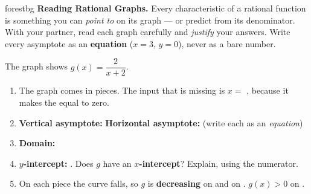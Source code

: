\documentclass[10pt]{article}
\newcommand{\lgrid}[4]{%
  \draw[step=1, linegray!40, very thin] (#1,#3) grid (#2,#4);
  \draw[->, semithick, charcoal] (#1,0)--(#2,0) node[below right, font=\scriptsize]{$x$};
  \draw[->, semithick, charcoal] (0,#3)--(0,#4) node[left, font=\scriptsize]{$y$};}
\begin{document}
\namepartnerperiod

\vspace{0.08in}

\begin{headlinebox}{forestbg}
\small\textbf{Reading Rational Graphs.} Every characteristic of a rational function is something you
can \emph{point to} on its graph --- or predict from its denominator. With your partner, read each
graph carefully and \emph{justify} your answers. Write every asymptote as an \textbf{equation}
($x=3$, $y=0$), never as a bare number.
\end{headlinebox}

\vspace{0.06in}

\begin{tcolorbox}[colback=white, colframe=black!40, title=\textbf{Tier R --- Remediate},
    fonttitle=\bfseries, arc=1.5mm, left=3mm, right=3mm, top=2mm, bottom=2mm, breakable]
The graph shows $g(x) = \dfrac{2}{x+2}$.
\begin{center}
\end{center}
\begin{enumerate}[leftmargin=1.7em, itemsep=7pt]
  \item The graph comes in  pieces. The input that is missing is $x=$ ,
        because it makes the  equal to zero.
  \item \textbf{Vertical asymptote:}  \quad \textbf{Horizontal asymptote:}
         \quad (write each as an \emph{equation})
  \item \textbf{Domain:} 
  \item \textbf{$y$-intercept:} . \quad Does $g$ have an \textbf{$x$-intercept}?
         \; Explain, using the numerator. 
  \item On each piece the curve falls, so $g$ is \textbf{decreasing} on  and on
        . \quad $g(x)>0$ on .
\end{enumerate}
\end{tcolorbox}
\end{document}
